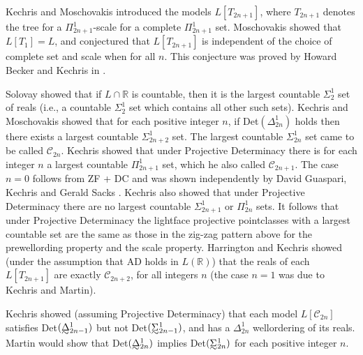 \documentclass{book}%
\def\underTilde#1{{\baselineskip=0pt\vtop{\hbox{$#1$}\hbox{$\sim$}}}{}}
\newcommand{\uTSigma}{\underTilde{\Sigma}}
\newcommand{\uTDelta}{\underTilde{\Delta}}
\begin{document}

Kechris and Moschovakis 
introduced the models $L[T_{2n+1}]$, where $T_{2n+1}$
denotes the tree for a $\Pi^{1}_{2n+1}$-scale for a complete
$\Pi^{1}_{2n+1}$ set. Moschovakis showed that $L[T_{1}] = L$, and conjectured that
$L[T_{2n+1}]$ is independent of
the choice of complete set and scale when for all $n$. This conjecture was proved by Howard Becker and Kechris in
.


Solovay  showed that if $L \cap \mathbb{R}$ is countable, then it is
the largest countable $\Sigma^{1}_{2}$ set of reals (i.e., a countable $\Sigma^{1}_{2}$ set which contains all other such sets). Kechris and Moschovakis  showed that for each positive integer $n$,
if Det$(\Delta^{1}_{2n})$ holds then there exists a largest countable $\Sigma^{1}_{2n+2}$ set. The largest countable $\Sigma^{1}_{2n}$ set came to be called $\mathcal{C}_{2n}$. Kechris  showed that under
Projective Determinacy there is for each integer $n$ a largest countable
$\Pi^{1}_{2n+1}$ set, which he also called $\mathcal{C}_{2n+1}$. The case $n=0$ follows from ZF + DC and was shown independently by David Guaspari,
Kechris and Gerald Sacks . Kechris also showed that under Projective Determinacy there are no largest countable $\Sigma^{1}_{2n+1}$ or $\Pi^{1}_{2n}$ sets. It follows that under Projective Determinacy the lightface
projective pointclasses with a largest countable set are the same as those in the zig-zag pattern above for the prewellording property and the scale property. Harrington and Kechris
 showed (under the assumption that AD holds in $L(\mathbb{R})$) that the reals of each
$L[T_{2n+1}]$ are exactly $\mathcal{C}_{2n+2}$, for all integers $n$ (the case $n=1$ was due to Kechris and Martin).

Kechris showed (assuming Projective Determinacy) that each model $L[\mathcal{C}_{2n}]$ satisfies Det$(\uTDelta^{1}_{2n-1})$ but not Det$(\uTSigma^{1}_{2n-1})$, and has a $\Delta^{1}_{2n}$ wellordering of its reals. Martin would show that Det$(\uTDelta^{1}_{2n})$ implies Det$(\uTSigma^{1}_{2n})$ for each positive integer $n$.
\end{document}

